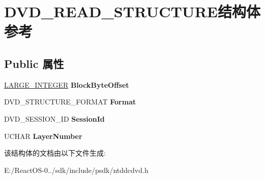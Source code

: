\hypertarget{struct_d_v_d___r_e_a_d___s_t_r_u_c_t_u_r_e}{}\section{D\+V\+D\+\_\+\+R\+E\+A\+D\+\_\+\+S\+T\+R\+U\+C\+T\+U\+R\+E结构体 参考}
\label{struct_d_v_d___r_e_a_d___s_t_r_u_c_t_u_r_e}
\subsection*{Public 属性}
\begin{DoxyCompactItemize}
\item 
\mbox{\label{struct_d_v_d___r_e_a_d___s_t_r_u_c_t_u_r_e_a1ae9d81b6116032e62d42a52c66e3138}} 
\hyperlink{union___l_a_r_g_e___i_n_t_e_g_e_r}{L\+A\+R\+G\+E\+\_\+\+I\+N\+T\+E\+G\+ER} {\bfseries Block\+Byte\+Offset}
\item 
\mbox{\label{struct_d_v_d___r_e_a_d___s_t_r_u_c_t_u_r_e_a57cc79a6c646e5980b55188be32a68b0}} 
D\+V\+D\+\_\+\+S\+T\+R\+U\+C\+T\+U\+R\+E\+\_\+\+F\+O\+R\+M\+AT {\bfseries Format}
\item 
\mbox{\label{struct_d_v_d___r_e_a_d___s_t_r_u_c_t_u_r_e_a1f47f431306da4ba3fed06e98388e3ac}} 
D\+V\+D\+\_\+\+S\+E\+S\+S\+I\+O\+N\+\_\+\+ID {\bfseries Session\+Id}
\item 
\mbox{\label{struct_d_v_d___r_e_a_d___s_t_r_u_c_t_u_r_e_a66a6098a40c6ac23cce4472fffc2c48d}} 
U\+C\+H\+AR {\bfseries Layer\+Number}
\end{DoxyCompactItemize}


该结构体的文档由以下文件生成\+:\begin{DoxyCompactItemize}
\item 
E\+:/\+React\+O\+S-\/0../sdk/include/psdk/ntddcdvd.\+h\end{DoxyCompactItemize}
